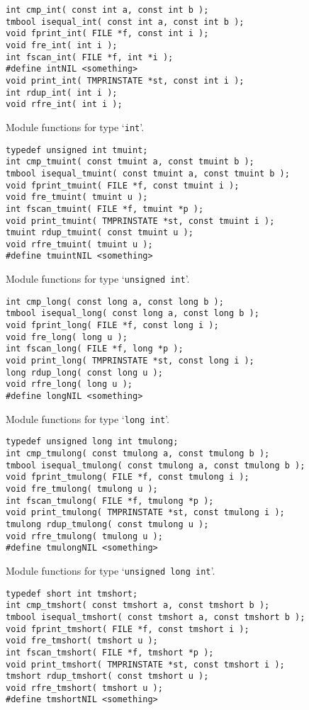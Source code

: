 \begin{verbatim}
int cmp_int( const int a, const int b );
tmbool isequal_int( const int a, const int b );
void fprint_int( FILE *f, const int i );
void fre_int( int i );
int fscan_int( FILE *f, int *i );
#define intNIL <something>
void print_int( TMPRINSTATE *st, const int i );
int rdup_int( int i );
void rfre_int( int i );
\end{verbatim}
\begin{desc}
Module functions for type `\texttt{int}'.
\end{desc}
\begin{verbatim}
typedef unsigned int tmuint;
int cmp_tmuint( const tmuint a, const tmuint b );
tmbool isequal_tmuint( const tmuint a, const tmuint b );
void fprint_tmuint( FILE *f, const tmuint i );
void fre_tmuint( tmuint u );
int fscan_tmuint( FILE *f, tmuint *p );
void print_tmuint( TMPRINSTATE *st, const tmuint i );
tmuint rdup_tmuint( const tmuint u );
void rfre_tmuint( tmuint u );
#define tmuintNIL <something>
\end{verbatim}
\begin{desc}
Module functions for type `\texttt{unsigned int}'.
\end{desc}
\begin{verbatim}
int cmp_long( const long a, const long b );
tmbool isequal_long( const long a, const long b );
void fprint_long( FILE *f, const long i );
void fre_long( long u );
int fscan_long( FILE *f, long *p );
void print_long( TMPRINSTATE *st, const long i );
long rdup_long( const long u );
void rfre_long( long u );
#define longNIL <something>
\end{verbatim}
\begin{desc}
Module functions for type `\texttt{long int}'.
\end{desc}
\begin{verbatim}
typedef unsigned long int tmulong;
int cmp_tmulong( const tmulong a, const tmulong b );
tmbool isequal_tmulong( const tmulong a, const tmulong b );
void fprint_tmulong( FILE *f, const tmulong i );
void fre_tmulong( tmulong u );
int fscan_tmulong( FILE *f, tmulong *p );
void print_tmulong( TMPRINSTATE *st, const tmulong i );
tmulong rdup_tmulong( const tmulong u );
void rfre_tmulong( tmulong u );
#define tmulongNIL <something>
\end{verbatim}
\begin{desc}
Module functions for type `\texttt{unsigned long int}'.
\end{desc}
\begin{verbatim}
typedef short int tmshort;
int cmp_tmshort( const tmshort a, const tmshort b );
tmbool isequal_tmshort( const tmshort a, const tmshort b );
void fprint_tmshort( FILE *f, const tmshort i );
void fre_tmshort( tmshort u );
int fscan_tmshort( FILE *f, tmshort *p );
void print_tmshort( TMPRINSTATE *st, const tmshort i );
tmshort rdup_tmshort( const tmshort u );
void rfre_tmshort( tmshort u );
#define tmshortNIL <something>
\end{verbatim}
